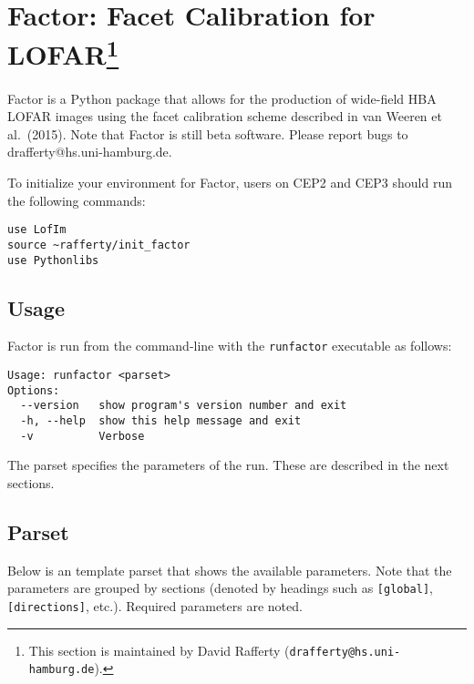 \documentclass[structabstract]{article}
\begin{document}

\section[Factor: Facet Calibration for LOFAR]{Factor: Facet Calibration for
LOFAR\footnote{This section is maintained by David Rafferty
({\tt drafferty@hs.uni-hamburg.de}).}}
\label{factor}

Factor is a Python package that allows for the production of wide-field HBA
LOFAR images using the facet calibration scheme described in van Weeren et al.\
(2015). Note that Factor is still beta software. Please report bugs to
drafferty@hs.uni-hamburg.de.

To initialize your environment for Factor, users on CEP2 and CEP3 should run the
following commands:
\begin{verbatim}
use LofIm
source ~rafferty/init_factor
use Pythonlibs
\end{verbatim}

\subsection{Usage}
\label{factor:usage}

Factor is run from the command-line with the {\tt runfactor} executable as
follows:
\begin{verbatim}
Usage: runfactor <parset>
Options:
  --version   show program's version number and exit
  -h, --help  show this help message and exit
  -v          Verbose
\end{verbatim}
The parset specifies the parameters of the run. These are described in the next
sections.

\subsection{Parset}
\label{factor:parset}

Below is an template parset that shows the available parameters. Note that the
parameters are grouped by sections (denoted by headings such as {\tt [global]},
{\tt [directions]}, etc.). Required parameters are noted.
\end{document}
